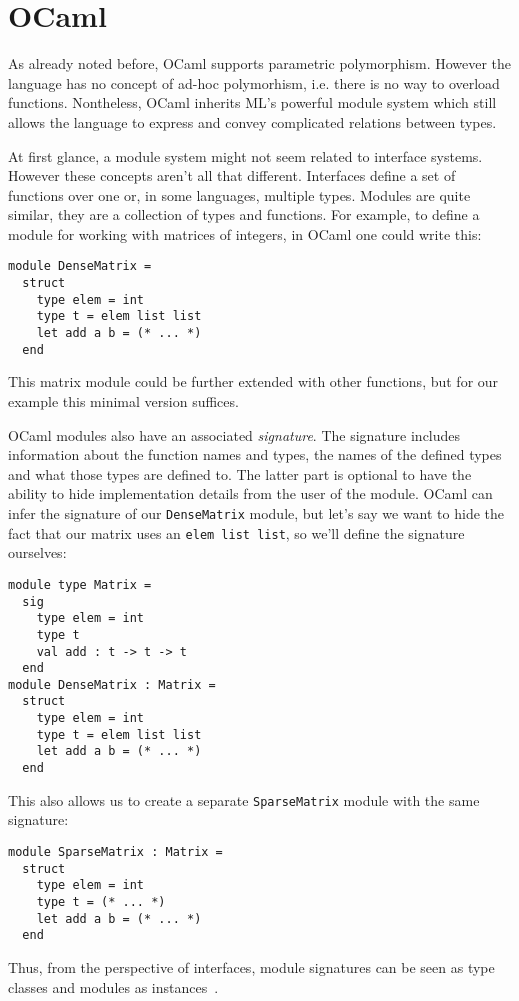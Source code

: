 \section{OCaml}

As already noted before, OCaml supports parametric polymorphism. However the language has no concept of ad-hoc polymorhism, i.e. there is no way to overload functions. Nontheless, OCaml inherits ML's powerful module system which still allows the language to express and convey complicated relations between types.

At first glance, a module system might not seem related to interface systems. However these concepts aren't all that different. Interfaces define a set of functions over one or, in some languages, multiple types. Modules are quite similar, they are a collection of types and functions. For example, to define a module for working with matrices of integers, in OCaml one could write this:
\begin{verbatim}
module DenseMatrix =
  struct
    type elem = int
    type t = elem list list
    let add a b = (* ... *)
  end
\end{verbatim}
This matrix module could be further extended with other functions, but for our example this minimal version suffices.

OCaml modules also have an associated \emph{signature}. The signature includes information about the function names and types, the names of the defined types and what those types are defined to. The latter part is optional to have the ability to hide implementation details from the user of the module. OCaml can infer the signature of our \verb|DenseMatrix| module, but let's say we want to hide the fact that our matrix uses an \verb|elem list list|, so we'll define the signature ourselves:
\begin{verbatim}
module type Matrix =
  sig
    type elem = int
    type t
    val add : t -> t -> t
  end
module DenseMatrix : Matrix =
  struct
    type elem = int
    type t = elem list list
    let add a b = (* ... *)
  end
\end{verbatim}
This also allows us to create a separate \verb|SparseMatrix| module with the same signature:
\begin{verbatim}
module SparseMatrix : Matrix =
  struct
    type elem = int
    type t = (* ... *)
    let add a b = (* ... *)
  end
\end{verbatim}
Thus, from the perspective of interfaces, module signatures can be seen as type classes and modules as instances~\cite{modular-type-classes}.

